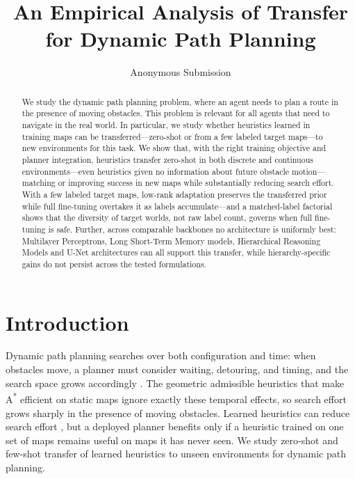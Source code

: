 \documentclass[letterpaper]{article} %
\title{An Empirical Analysis of Transfer for Dynamic Path Planning}
\author{
    Anonymous Submission
}
\begin{document}
\maketitle

\begin{abstract}
We study the dynamic path planning problem, where an agent needs to plan a route in the presence of moving obstacles. This problem is relevant for all agents that need to navigate in the real world. In particular, we study whether heuristics learned in training maps can be transferred---zero-shot or from a few labeled target maps---to new environments for this task. We show that, with the right training objective and planner integration, heuristics transfer zero-shot in both discrete and continuous environments---even heuristics given no information about future obstacle motion---matching or improving success in new maps while substantially reducing search effort. With a few labeled target maps, low-rank adaptation preserves the transferred prior while full fine-tuning overtakes it as labels accumulate---and a matched-label factorial shows that the diversity of target worlds, not raw label count, governs when full fine-tuning is safe. Further, across comparable backbones no architecture is uniformly best: Multilayer Perceptrons, Long Short-Term Memory models, Hierarchical Reasoning Models and U-Net architectures can all support this transfer, while hierarchy-specific gains do not persist across the tested formulations.
\end{abstract}


\section{Introduction}

Dynamic path planning searches over both configuration and time: when obstacles move, a planner must consider waiting, detouring, and timing, and the search space grows accordingly \citep{silver2005cooperative,phillips2011sipp}. The geometric admissible heuristics that make A\textsuperscript{*} \citep{hart1968astar} efficient on static maps ignore exactly these temporal effects, so search effort grows sharply in the presence of moving obstacles. Learned heuristics can reduce search effort \citep{arfaee2011bootstrap,bhardwaj2017sail,yonetani2021neuralastar}, but a deployed planner benefits only if a heuristic trained on one set of maps remains useful on maps it has never seen. We study zero-shot and few-shot transfer of learned heuristics to unseen environments for dynamic path planning.
\end{document}
